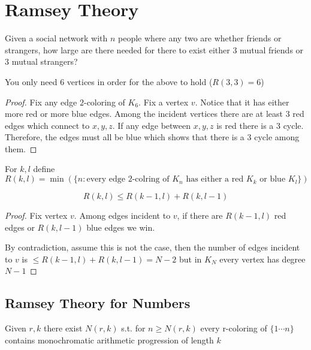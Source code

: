 
\section{Ramsey Theory}
    
\begin{question}
        Given a social network with \(n\) people where any two are whether friends or strangers, how large are there needed for there to exist either \(3\) mutual friends or \(3\) mutual strangers?
\end{question}

\begin{proposition}
    You only need \(6\) vertices in order for the above to hold (\(R(3,3) = 6\))
\end{proposition}
\begin{proof}
    Fix any edge \(2\)-coloring of \(K_6\). Fix a vertex \(v\). Notice that it has either more red or more blue edges. Among the incident vertices there are at least \(3\) red edges which connect to \(x,y,z\). If any edge between \(x,y,z\) is red there is a 3 cycle. Therefore, the edges must all be blue which shows that there is a 3 cycle among them.  
\end{proof}

\begin{definition}
    \label{def:ramsey numbers}
    For \(k, l\) define
    \[
        R(k, l) = \min (\{n : \text{every edge 2-colring of \(K_n\) has either a red \(K_k\) or blue \(K_l\)}\})
    \]
\end{definition}

\begin{theorem}[ramsey]
    \label{thm:ramsey}
    \[
        R(k, l) \leq R(k - 1, l) + R(k, l - 1)
    \]
\end{theorem} 
\begin{proof}
    Fix vertex \(v\). Among edges incident to \(v\), if there are \(R(k - 1, l)\) red edges or \(R(k, l - 1)\) blue edges we win. 

    By contradiction, assume this is not the case, then the number of edges incident to \(v\) is \(\leq R(k-1 , l) + R(k, l-1) = N - 2\) but in \(K_N\) every vertex has degree \(N-1\) 
\end{proof}

\subsection{Ramsey Theory for Numbers}

\begin{theorem}
    \label{thm:van der waerden}
    Given \(r, k\) there exist \(N(r, k)\) s.t. for \(n \geq N(r,k)\)  every r-coloring of \(\{1 \cdots n\}\) contains monochromatic arithmetic progression of length \(k\) 
\end{theorem} 
